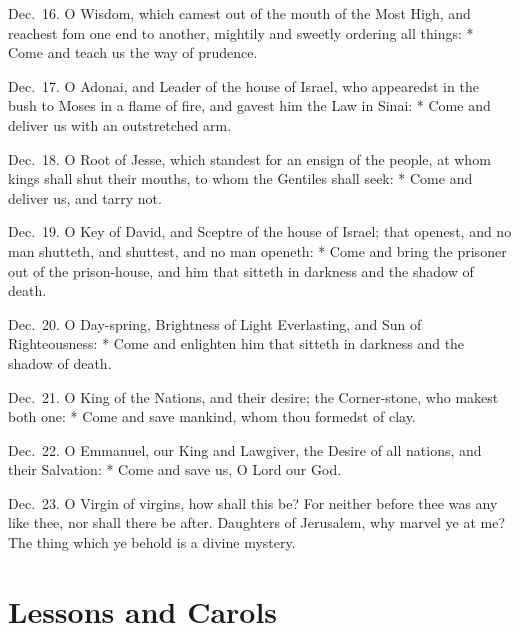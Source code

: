 Dec.~16.  O Wisdom, which camest out of the mouth of the Most High, and reachest fom one end to another, mightily and sweetly ordering all things: * Come and teach us the way of prudence.

Dec.~17.   O Adonai, and Leader of the house of Israel, who appearedst in the bush to Moses in a flame of fire, and gavest him the Law in Sinai: * Come and deliver us with an outstretched arm.

Dec.~18.  O Root of Jesse, which standest for an ensign of the people, at whom kings shall shut their mouths, to whom the Gentiles shall seek: * Come and deliver us, and tarry not.

Dec.~19.   O Key of David, and Sceptre of the house of Israel; that openest, and no man shutteth, and shuttest, and no man openeth: * Come and bring the prisoner out of the prison-house, and him that sitteth in darkness and the shadow of death.

Dec.~20.    O Day-spring, Brightness of Light Everlasting, and Sun of Righteousness: * Come and enlighten him that sitteth in darkness and the shadow of death.

Dec.~21.    O King of the Nations, and their desire; the Corner-stone, who makest both one: * Come and save mankind, whom thou formedst of clay.

Dec.~22.    O Emmanuel, our King and Lawgiver, the Desire of all nations, and their Salvation: * Come and save us, O Lord our God.

Dec.~23.    O Virgin of virgins, how shall this be?  For neither before thee was any like thee, nor shall there be after.  Daughters of Jerusalem, why marvel ye at me? The thing which ye behold is a divine mystery.

\fleuron

\section{Lessons and Carols}


